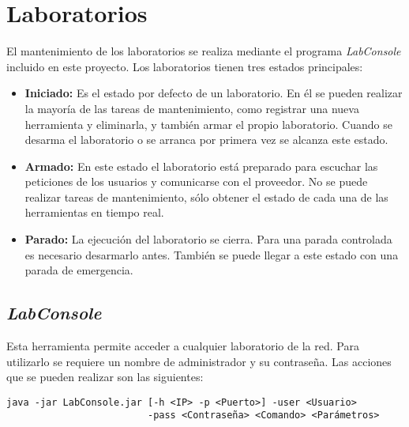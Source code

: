 \section*{Laboratorios}
El mantenimiento de los laboratorios se realiza mediante el programa 
\emph{LabConsole} incluido en este proyecto. Los laboratorios tienen 
tres estados principales:

\begin{itemize}
\item \textbf{Iniciado:} Es el estado por defecto de un laboratorio. 
En él se pueden realizar la mayoría de las tareas de mantenimiento, 
como registrar una nueva herramienta y eliminarla, y también armar el 
propio laboratorio. Cuando se desarma el laboratorio o se arranca por 
primera vez se alcanza este estado.
\item \textbf{Armado:} En este estado el laboratorio está preparado 
para escuchar las peticiones de los usuarios y comunicarse con el 
proveedor. No se puede realizar tareas de mantenimiento, sólo obtener 
el estado de cada una de las herramientas en tiempo real.
\item \textbf{Parado:} La ejecución del laboratorio se cierra. Para 
una parada controlada es necesario desarmarlo antes. También se puede 
llegar a este estado con una parada de emergencia.
\end{itemize}

\subsection*{\emph{LabConsole}}
Esta herramienta permite acceder a cualquier laboratorio de la red. 
Para utilizarlo se requiere un nombre de administrador y su 
contraseña. Las acciones que se pueden realizar son las siguientes:

\begin{verbatim}
java -jar LabConsole.jar [-h <IP> -p <Puerto>] -user <Usuario>
                         -pass <Contraseña> <Comando> <Parámetros>
\end{verbatim}


